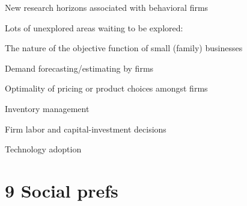 \documentclass[aspectratio=169, 10pt, handout]{beamer}
\newenvironment{wideitemize}{\itemize\addtolength{\itemsep}{10pt}}{\enditemize}
\begin{document}
\begin{frame}{New research horizons associated with behavioral firms}

\begin{wideitemize}

	\item Lots of unexplored areas waiting to be explored:

	\begin{wideitemize}

    \smallskip
    
		\item The nature of the objective function of small (family) businesses 

        \item Demand forecasting/estimating by firms

		\item Optimality of pricing or product choices amongst firms

		\item Inventory management

		\item Firm labor and capital-investment decisions

		\item Technology adoption

	\end{wideitemize}
	
\end{wideitemize}

\end{frame}

\section{9 Social prefs}
\end{document}
